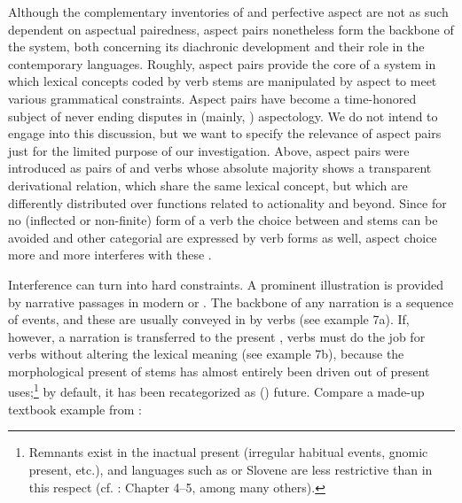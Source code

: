\documentclass[output=paper]{langsci/langscibook}
\begin{document}
Although the complementary inventories of  and perfective aspect are not as such dependent on aspectual pairedness, aspect pairs nonetheless form the backbone of the system, both concerning its diachronic development and their role in the contemporary  languages. Roughly, aspect pairs provide the core of a system in which lexical concepts coded by verb stems are manipulated by aspect to meet various grammatical constraints. Aspect pairs have become a time-honored subject of never ending disputes in  (mainly, ) aspectology. We do not intend to engage into this discussion, but we want to specify the relevance of aspect pairs just for the limited purpose of our investigation. Above, aspect pairs were introduced as pairs of  and  verbs whose absolute majority shows a transparent derivational relation, which share the same lexical concept, but which are differently distributed over functions related to actionality and beyond. Since for no (inflected or non-finite) form of a verb the choice between  and  stems can be avoided and other categorial  are expressed by verb forms as well, aspect choice more and more interferes with these .

Interference can turn into hard constraints. A prominent illustration is provided by narrative passages in modern  or . The backbone of any narration is a sequence of events, and these are usually conveyed in  by  verbs (see example 7a). If, however, a  narration is transferred to the present ,  verbs must do the job for  verbs without altering the lexical meaning (see example 7b), because the morphological present  of  stems has almost entirely been driven out of present  uses;\footnote{Remnants exist in the inactual present (irregular habitual events, gnomic present, etc.), and  languages such as  or Slovene are less restrictive than  in this respect (cf. \citealt{Dickey2000}: Chapter 4–5, among many others).} by default, it has been recategorized as () future. Compare a made-up textbook example from :
\end{document}
